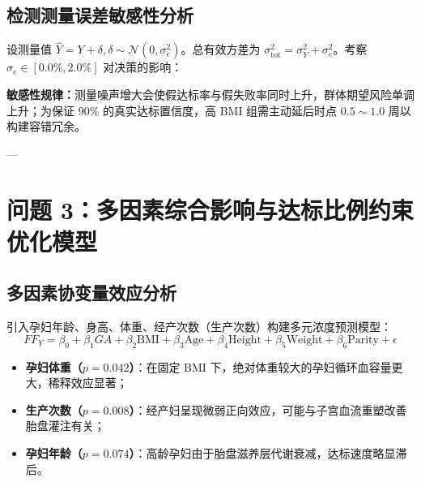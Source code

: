\documentclass[11pt,a4paper]{article}
\begin{document}
\subsection{检测测量误差敏感性分析}
设测量值 $\hat{Y} = Y + \delta, \delta \sim \mathcal{N}(0, \sigma_e^2)$。总有效方差为 $\sigma_{\text{tot}}^2 = \sigma_Y^2 + \sigma_e^2$。考察 $\sigma_e \in [0.0\%, 2.0\%]$ 对决策的影响：

\begin{table}[H]
\centering
\small
\caption{测量误差 $\sigma_e$ 对群体期望风险与各组安全时点的敏感性推演}
\end{table}

\textbf{敏感性规律：}测量噪声增大会使假达标率与假失败率同时上升，群体期望风险单调上升；为保证 90\% 的真实达标置信度，高 BMI 组需主动延后时点 $0.5 \sim 1.0$ 周以构建容错冗余。

---

\section{问题 3：多因素综合影响与达标比例约束优化模型}

\subsection{多因素协变量效应分析}
引入孕妇年龄、身高、体重、经产次数（生产次数）构建多元浓度预测模型：
$$FF_Y = \beta_0 + \beta_1 GA + \beta_2 \text{BMI} + \beta_3 \text{Age} + \beta_4 \text{Height} + \beta_5 \text{Weight} + \beta_6 \text{Parity} + \epsilon$$

\begin{itemize}[leftmargin=*]
    \item \textbf{孕妇体重（$p = 0.042$）}：在固定 BMI 下，绝对体重较大的孕妇循环血容量更大，稀释效应显著；
    \item \textbf{生产次数（$p = 0.008$）}：经产妇呈现微弱正向效应，可能与子宫血流重塑改善胎盘灌注有关；
    \item \textbf{孕妇年龄（$p = 0.074$）}：高龄孕妇由于胎盘滋养层代谢衰减，达标速度略显滞后。
\end{itemize}
\end{document}
